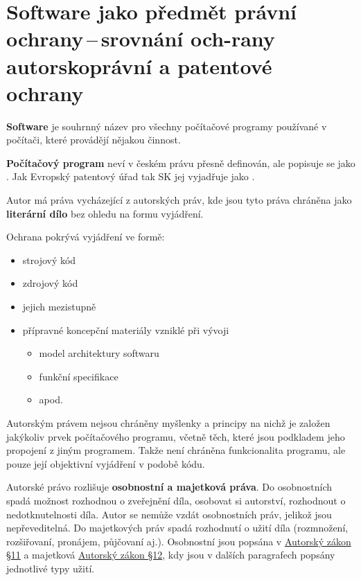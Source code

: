 \section[Software jako předmět právní ochrany\,--\,srovnání ochrany autorskoprávní a patentové ochrany]{Software jako předmět právní ochrany\,--\,srovnání och-rany autorskoprávní a patentové ochrany}

\textbf{Software} je souhrnný název pro všechny počítačové programy používané v počítači, které provádějí nějakou činnost.

\textbf{Počítačový program} neví v českém právu přesně definován, ale popisuje se jako . Jak Evropský patentový úřad tak SK jej vyjadřuje jako .

Autor má práva vycházející z autorských práv, kde jsou tyto práva chráněna jako \textbf{literární dílo} bez ohledu na formu vyjádření.

Ochrana pokrývá vyjádření ve formě:
\begin{itemize}[noitemsep]
    \item strojový kód
    \item zdrojový kód
    \item jejich mezistupně
    \item přípravné koncepční materiály vzniklé při vývoji
    \begin{itemize}[noitemsep]
        \item model architektury softwaru
        \item funkční specifikace
        \item apod.
    \end{itemize}
\end{itemize}

Autorským právem nejsou chráněny myšlenky a principy na nichž je založen jakýkoliv prvek počítačového programu, včetně těch, které jsou podkladem jeho propojení z jiným programem. Takže není chráněna funkcionalita programu, ale pouze její objektivní vyjádření v podobě kódu.

Autorské právo rozlišuje \textbf{osobnostní a majetková práva}. Do osobnostních spadá možnost rozhodnou o zveřejnění díla, osobovat si autorství, rozhodnout o nedotknutelnosti díla. Autor se nemůže vzdát osobnostních práv, jelikož jsou nepřeveditelná. Do majetkových práv spadá rozhodnutí o užití díla (rozmnožení, rozšiřovaní, pronájem, půjčovaní aj.). Osobnostní jsou popsána v \href{https://www.zakonyprolidi.cz/cs/2000-121#p11}{Autorský zákon §11} a majetková  \href{https://www.zakonyprolidi.cz/cs/2000-121#p12}{Autorský zákon §12}, kdy jsou v dalších paragrafech popsány jednotlivé typy užití. 

